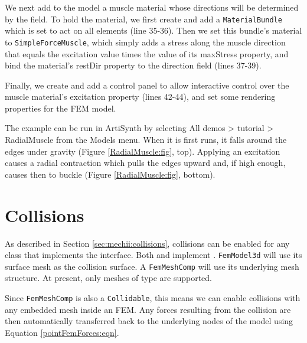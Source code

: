 We next add to the model a muscle material whose directions will be
determined by the field. To hold the material, we first create and add
a {\tt MaterialBundle} which is set to act on all elements (line
35-36). Then we set this bundle's material to {\tt SimpleForceMuscle},
which simply adds a stress along the muscle direction that equals
the excitation value times the value of its {\sf maxStress} property,
and bind the material's {\sf restDir}
property to the direction field (lines 37-39).

Finally, we create and add a control panel to allow interactive
control over the muscle material's excitation property (lines 42-44),
and set some rendering properties for the FEM model.


The example can be run in ArtiSynth by selecting {\sf All demos >
tutorial > RadialMuscle} from the {\sf Models} menu.  When it is first
runs, it falls around the edges under gravity (Figure
\ref{RadialMuscle:fig}, top). Applying an excitation causes a radial
contraction which pulls the edges upward and, if high enough, causes
then to buckle (Figure \ref{RadialMuscle:fig}, bottom).


\section{Collisions}
\label{sec:fem:collision}

As described in Section \ref{sec:mechii:collisions}, collisions can be enabled 
for any class that implements the 
 interface.  Both 
 and 
 implement 
.  {\tt FemModel3d}
will use its surface mesh as the collision surface.  A {\tt FemMeshComp} will use
its underlying mesh structure.  At present, only meshes of type 
 are supported.

Since {\tt FemMeshComp} is also a {\tt Collidable}, this means we can enable 
collisions with any embedded mesh inside an FEM.  Any forces resulting from
the collision are then automatically transferred back to the underlying nodes 
of the model using Equation \eqref{pointFemForces:eqn}.

